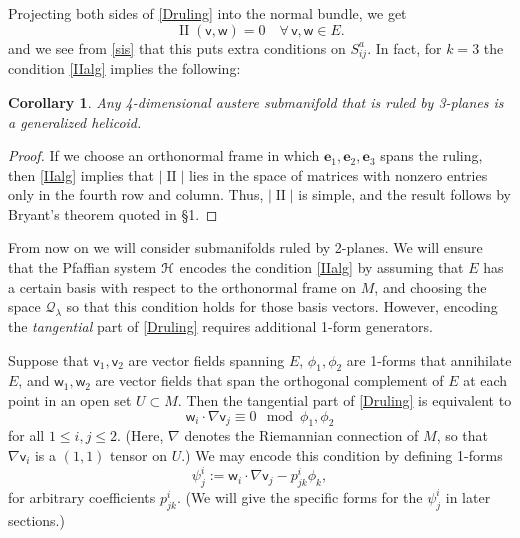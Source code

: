 \documentclass[12pt,reqno]{amsart}
\newtheorem{cor}[theorem]{Corollary}
\theoremstyle{definition}
\theoremstyle{remark}
\begin{document}
Projecting both sides  of \eqref{Druling} into the normal bundle, we get
\begin{equation}\label{IIalg}
{\operatorname{II}}({\mathsf v},{\mathsf w})=0\quad \forall\, {\mathsf v},{\mathsf w} \in E.
\end{equation}
and we see from \eqref{sis} that this puts extra conditions on  $S^a_{ij}$.
In fact, for $k=3$ the condition \eqref{IIalg} implies the following:
\begin{cor}\label{threeruled}  Any 4-dimensional austere submanifold that
is ruled by 3-planes is a generalized helicoid.
\end{cor}
\begin{proof}  If we choose an orthonormal frame in which ${{\mathbf e}_1,{\mathbf e}_2,{\mathbf e}_3}$ spans the ruling,
then \eqref{IIalg} implies that $|{\operatorname{II}} |$ lies in the space of matrices with nonzero entries
only in the fourth row and column.  Thus, $|{\operatorname{II}} |$ is simple, and the result follows by Bryant's
theorem quoted in \S1.
\end{proof}

From now on we will consider submanifolds ruled by 2-planes.  We will ensure that
the Pfaffian system ${{\EuScript H}}$ encodes the condition \eqref{IIalg} by assuming that $E$ has
a certain basis with respect to the orthonormal frame on $M$, and choosing
the space ${\mathcal Q}_\lambda$ so that this condition holds for those basis vectors.
However, encoding the {\em tangential} part of \eqref{Druling} requires additional 1-form generators.

Suppose that ${\mathsf v}_1,{\mathsf v}_2$ are vector fields spanning $E$, $\phi_1,\phi_2$
are 1-forms that annihilate $E$, and ${\mathsf w}_1, {\mathsf w}_2$ are vector fields
that span the orthogonal complement of $E$ at each point in an open set $U\subset M$.
Then the tangential part of \eqref{Druling} is equivalent to
\begin{equation}\label{Pruling}
{\mathsf w}_i\cdot \nabla {\mathsf v}_j \equiv 0 \mod \phi_1, \phi_2
\end{equation}
for all $1\le i,j \le 2$.  (Here, $\nabla$ denotes the Riemannian connection of $M$,
so that $\nabla {\mathsf v}_i$ is a $(1,1)$ tensor on $U$.)
We may encode this condition by defining 1-forms
\begin{equation}\label{psigeneral}
\psi^i_j := {\mathsf w}_i \cdot \nabla {\mathsf v}_j -p^i_{jk} \phi_k,
\end{equation}
for arbitrary coefficients $p^i_{jk}$.  (We will give the specific
forms for the $\psi^i_j$ in later sections.)
\end{document}
